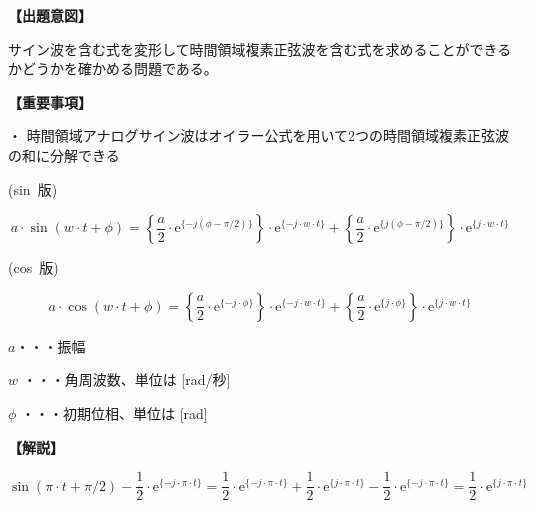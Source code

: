 \noindent \textbf{【出題意図】}

\bigskip
\noindent サイン波を含む式を変形して時間領域複素正弦波を含む式を求めることができるかどうかを確かめる問題である。

\vspace{1em}
\noindent \textbf{【重要事項】}

\medskip
\noindent ・ 時間領域アナログサイン波はオイラー公式を用いて2つの時間領域複素正弦波の和に分解できる

\medskip
\noindent \mbox{(sin 版)}

\[
a \cdot \sin ( w \cdot t + \phi )
=  \left \{ \frac{a}{2} \cdot \textrm{e}^{\{-j (\phi-\pi/2) \}} \right \} \cdot \textrm{e}^{\{-j \cdot w \cdot t \}}
+  \left \{ \frac{a}{2} \cdot \textrm{e}^{\{j (\phi-\pi/2) \}} \right \} \cdot \textrm{e}^{\{j \cdot w \cdot t \}}
\]

\medskip
\noindent \mbox{(cos 版)}

\[
a \cdot \cos ( w \cdot t + \phi )
=  \left \{ \frac{a}{2} \cdot \textrm{e}^{\{-j \cdot \phi \}} \right \} \cdot \textrm{e}^{\{-j \cdot w \cdot t \}}
+  \left \{ \frac{a}{2} \cdot \textrm{e}^{\{j  \cdot \phi \}} \right \} \cdot \textrm{e}^{\{j \cdot w \cdot t \}}
\]

\bigskip
\noindent  $a$・・・振幅

\bigskip
\noindent $w$ ・・・角周波数、単位は [rad/秒]

\bigskip
\noindent $\phi$ ・・・初期位相、単位は [rad]

\bigskip

\vspace{1em}
\noindent \textbf{【解説】}

\bigskip

\[
\sin (\pi \cdot t+\pi/2) - \frac{1}{2} \cdot \textrm{e}^{\{-j \cdot \pi \cdot t \}}
=
\frac{1}{2} \cdot \textrm{e}^{\{-j \cdot \pi \cdot t \}} + \frac{1}{2} \cdot \textrm{e}^{\{j \cdot \pi \cdot t \}} - \frac{1}{2} \cdot \textrm{e}^{\{-j \cdot \pi \cdot t \}}
=
\frac{1}{2} \cdot \textrm{e}^{\{j \cdot \pi \cdot t \}}
\]
